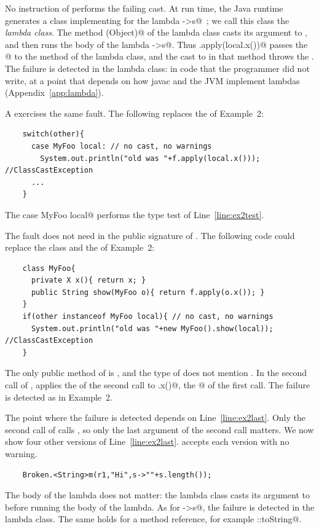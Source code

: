 No instruction of \Q@m@ performs the failing cast.
At run time, the Java runtime generates a class implementing \Q@Function@ for the lambda \Q@s->s@~\cite{jep371}; we call this class the \emph{lambda class}.
The method \Q@apply(Object)@ of the lambda class casts its argument to \Q@String@, and then runs the body of the lambda \Q@s->s@.
Thus \Q@f.apply(local.x())@ passes the \Q@Integer@ {}@ to the method \Q@apply@ of the lambda class, and the cast to \Q@String@ in that method throws the \Q@ClassCastException@.
The failure is detected in the lambda class: in code that the programmer did not write, at a point that depends on how javac and the JVM implement lambdas (Appendix~\ref{app:lambda}).

A \Q@switch@ exercises the same fault.
The following \Q@switch@ replaces the \Q@if@ of Example~2:

\begin{lstlisting}
    switch(other){
      case MyFoo local: // no cast, no warnings
        System.out.println("old was "+f.apply(local.x())); //ClassCastException
      ...
    }
\end{lstlisting}

The case \Q@case MyFoo local@ performs the type test of Line~\ref{line:ex2test}.

The fault does not need \Q@X@ in the public signature of \Q@MyFoo@.
The following code could replace the class \Q@MyFoo@ and the \Q@if@ of Example~2:

\begin{lstlisting}
    class MyFoo{
      private X x(){ return x; }
      public String show(MyFoo o){ return f.apply(o.x()); }
    }
    if(other instanceof MyFoo local){ // no cast, no warnings
      System.out.println("old was "+new MyFoo().show(local)); //ClassCastException
    }
\end{lstlisting}

The only public method of \Q@MyFoo@ is \Q@show@, and the type of \Q@show@ does not mention \Q@X@.
In the second call of \Q@m@, \Q@show@ applies the \Q@f@ of the second call to \Q@o.x()@, the \Q@Integer@ {}@ of the first call.
The failure is detected as in Example~2.

The point where the failure is detected depends on Line~\ref{line:ex2last}.
Only the second call of \Q@m@ calls \Q@f@, so only the last argument of the second call matters.
We now show four other versions of Line~\ref{line:ex2last}.
\javac accepts each version with no warning.

\begin{lstlisting}
    Broken.<String>m(r1,"Hi",s->""+s.length());
\end{lstlisting}
The body of the lambda does not matter: the lambda class casts its argument to \Q@String@ before running the body of the lambda.
As for \Q@s->s@, the failure is detected in the lambda class.
The same holds for a method reference, for example \Q@String::toString@.

